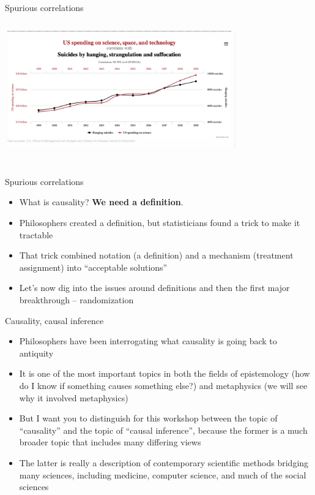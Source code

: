 \documentclass{beamer}
\begin{document}
\begin{frame}{Spurious correlations}
  \centering
  \includegraphics[scale=0.5,height=6.5cm, width=10cm]{./lecture_includes/spurious_correlation}
\end{frame}

\begin{frame}{Spurious correlations}

\begin{itemize}

\item What is causality?  \textbf{We need a definition}.
\item Philosophers created a definition, but statisticians found a trick to make it tractable
\item That trick combined notation (a definition) and a mechanism (treatment assignment) into ``acceptable solutions''
\item Let's now dig into the issues around definitions and then the first major breakthrough -- randomization

\end{itemize}

\end{frame}

\begin{frame}{Causality, causal inference}

\begin{itemize}

\item Philosophers have been interrogating what causality is going back to antiquity
\item It is one of the most important topics in both the fields of epistemology (how do I know if something causes something else?) and metaphysics (we will see why it involved metaphysics)
\item But I want you to distinguish for this workshop between the topic of ``causality'' and the topic of ``causal inference'', because the former is a much broader topic that includes many differing views
\item The latter is really a description of contemporary scientific methods bridging many sciences, including medicine, computer science, and much of the social sciences

\end{itemize}

\end{frame}
\end{document}
